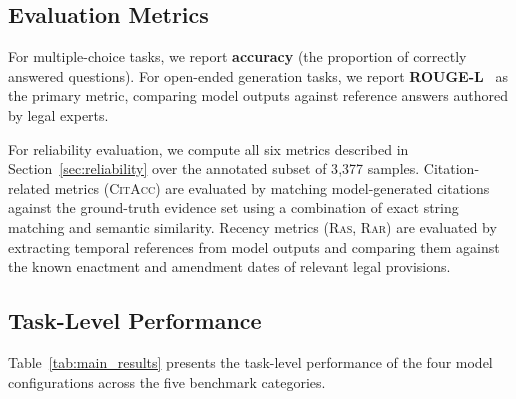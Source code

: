 \documentclass[11pt,a4paper]{article}
\newcommand{\citacc}{\textsc{CitAcc}}
\newcommand{\ras}{\textsc{Ras}}
\newcommand{\rar}{\textsc{Rar}}
\newcommand{\rougel}{ROUGE-L}
\begin{document}
\subsection{Evaluation Metrics}

For multiple-choice tasks, we report \textbf{accuracy} (the proportion of correctly answered questions).
For open-ended generation tasks, we report \textbf{\rougel{}}~\citep{lin2004rouge} as the primary metric, comparing model outputs against reference answers authored by legal experts.

For reliability evaluation, we compute all six metrics described in Section~\ref{sec:reliability} over the annotated subset of 3{,}377 samples.
Citation-related metrics (\citacc) are evaluated by matching model-generated citations against the ground-truth evidence set using a combination of exact string matching and semantic similarity.
Recency metrics (\ras, \rar) are evaluated by extracting temporal references from model outputs and comparing them against the known enactment and amendment dates of relevant legal provisions.

\subsection{Task-Level Performance}

Table~\ref{tab:main_results} presents the task-level performance of the four model configurations across the five benchmark categories.
\end{document}
